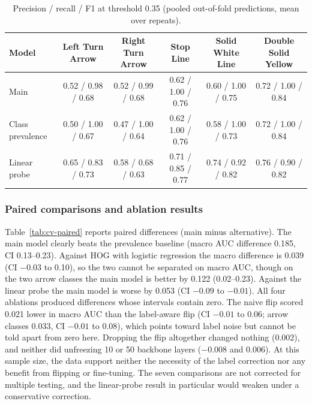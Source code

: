 \documentclass[11pt]{article}
\begin{document}
\begin{table}[!htbp]
\centering\small
\caption{Precision / recall / F1 at threshold 0.35 (pooled out-of-fold predictions, mean over repeats).}
\label{tab:cv-thr}
\footnotesize\setlength{\tabcolsep}{5pt}
\begin{adjustbox}{max width=\textwidth}
\begin{tabular}{P{0.19\textwidth}ccccc}
\toprule
Model & Left Turn Arrow & Right Turn Arrow & Stop Line & Solid White Line & Double Solid Yellow \\
\midrule
Main & 0.52 / 0.98 / 0.68 & 0.52 / 0.99 / 0.68 & 0.62 / 1.00 / 0.76 & 0.60 / 1.00 / 0.75 & 0.72 / 1.00 / 0.84 \\
Class prevalence & 0.50 / 1.00 / 0.67 & 0.47 / 1.00 / 0.64 & 0.62 / 1.00 / 0.76 & 0.58 / 1.00 / 0.73 & 0.72 / 1.00 / 0.84 \\
Linear probe & 0.65 / 0.83 / 0.73 & 0.58 / 0.68 / 0.63 & 0.71 / 0.85 / 0.77 & 0.74 / 0.92 / 0.82 & 0.76 / 0.90 / 0.82 \\
\bottomrule
\end{tabular}
\end{adjustbox}
\end{table}

\subsubsection*{Paired comparisons and ablation results}
Table~\ref{tab:cv-paired} reports paired differences (main minus alternative). The main model clearly beats the prevalence baseline (macro AUC difference 0.185, CI 0.13--0.23). Against HOG with logistic regression the macro difference is 0.039 (CI $-0.03$ to 0.10), so the two cannot be separated on macro AUC, though on the two arrow classes the main model is better by 0.122 (0.02--0.23). Against the linear probe the main model is worse by 0.053 (CI $-0.09$ to $-0.01$). All four ablations produced differences whose intervals contain zero. The naive flip scored 0.021 lower in macro AUC than the label-aware flip (CI $-0.01$ to 0.06; arrow classes 0.033, CI $-0.01$ to 0.08), which points toward label noise but cannot be told apart from zero here. Dropping the flip altogether changed nothing (0.002), and neither did unfreezing 10 or 50 backbone layers ($-0.008$ and 0.006). At this sample size, the data support neither the necessity of the label correction nor any benefit from flipping or fine-tuning. The seven comparisons are not corrected for multiple testing, and the linear-probe result in particular would weaken under a conservative correction.
\end{document}

